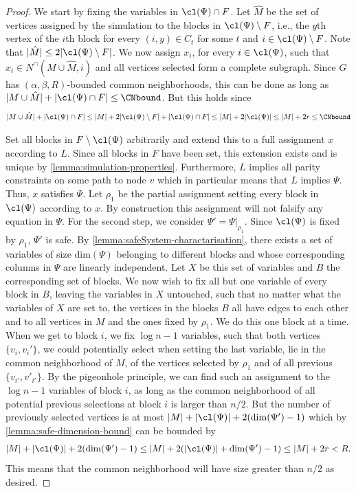 {}{
\begin{proof}
    We start by fixing the variables in $\cl(\Psi)\cap F$. Let $\hat M$ be the set of vertices assigned by the simulation to the blocks in $\cl(\Psi)\setminus F$, i.e., the $y$th vertex of the $i$th block for every $(i,y)\in C_t$ for some $t$ and $i\in \cl(\Psi)\setminus F$. Note that $|\hat M|\leq 2|\cl(\Psi)\setminus F|$. We now assign $x_i$, for every $i\in \cl(\Psi)$, such that $x_i\in N^\cap(M\cup\hat M,i)$ and all vertices selected form a complete subgraph. Since $G$ has $(\alpha, \beta, R)$-bounded common neighborhoods, this can be done as long as $|M\cup\hat M|+|\cl(\Psi)\cap F|\leq \CNbound$. But this holds since 
    \begin{align*}
        |M\cup\hat M|+|\cl(\Psi)\cap F|\leq |M|+ 2|\cl(\Psi)\setminus F|+|\cl(\Psi)\cap F|\leq |M| + 2|\cl(\Psi)|\leq |M|+2r \leq \CNbound
    \end{align*}

    Set all blocks in $F\setminus \cl(\Psi)$ arbitrarily and extend this to a full assignment $x$ according to $L$. Since all blocks in $F$ have been set, this extension exists and is unique by \autoref{lemma:simulation-properties}. Furthermore, $L$ implies all parity constraints on some path to node $v$ which in particular means that $L$ implies $\Psi$. Thus, $x$ satisfies $\Psi$. Let $\rho_1$ be the partial assignment setting every block in $\cl(\Psi)$ according to $x$. By construction this assignment will not falsify any equation in $\Psi$. 
    For the second step, we consider $\Psi' = \Psi|_{\rho_1}$. Since $\cl(\Psi)$ is fixed by $\rho_1$, $\Psi'$ is safe. By \autoref{lemma:safeSystem-charactarisation}, there exists a set of variables of size $\mathrm{dim}(\Psi)$ belonging to different blocks and whose corresponding columns in $\Psi$ are linearly independent. Let $X$ be this set of variables and $B$ the corresponding set of blocks. We now wish to fix all but one variable of every block in $B$, leaving the variables in $X$ untouched, such that no matter what the variables of $X$ are set to, the vertices in the blocks $B$ all have edges to each other and to all vertices in $M$ and the ones fixed by $\rho_1$. We do this one block at a time. When we get to block $i$, we fix ${\log n}-1$ variables, such that both vertices $\{v_i,v_i'\}$, we could potentially select when setting the last variable, lie in the common neighborhood of $M$, of the vertices selected by $\rho_1$ and of all previous $\{v_{i'},v'_{i'}\}$. By the pigeonhole principle, we can find such an assignment to the ${\log n}-1$ variables of block $i$, as long as the common neighborhood of all potential previous selections at block $i$ is larger than $n/2$. But the number of previously selected vertices is at most $|M|+|\cl(\Psi)|+2(\mathrm{dim}(\Psi')-1)$ which by \autoref{lemma:safe-dimension-bound} can be bounded by 
    \begin{equation*}
        |M|+|\cl(\Psi)|+2(\mathrm{dim}(\Psi')-1) \leq |M|+2(|\cl(\Psi)|+\mathrm{dim}(\Psi')-1)\leq |M|+2r < R.
    \end{equation*}
    This means that the common neighborhood will have size greater than $n/2$ as desired.
    

\end{proof}}
